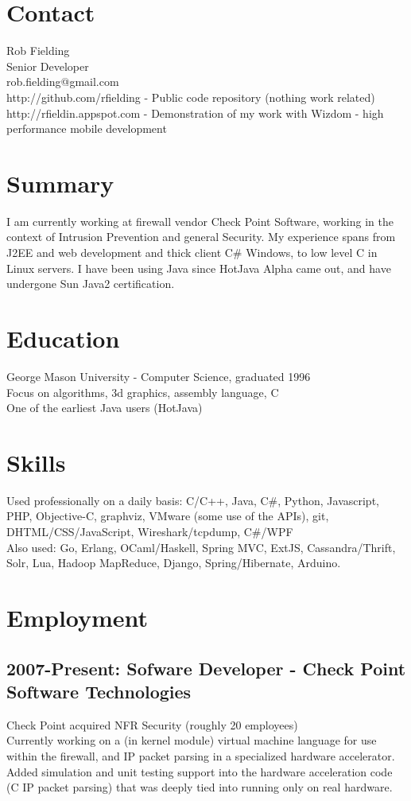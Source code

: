 \documentclass[margin]{res}
\begin{document}
\begin{resume}
\section{Contact}
Rob Fielding \\
Senior Developer \\
rob.fielding@gmail.com \\
http://github.com/rfielding - Public code repository (nothing work related) \\
http://rfieldin.appspot.com - Demonstration of my work with Wizdom - high performance mobile development 

\section{Summary}
I am currently working at firewall vendor Check Point Software,
working in the context of Intrusion Prevention and general Security.
My experience spans from J2EE and web development and thick client
C\# Windows, to low level C in Linux servers.
I have been using Java since HotJava Alpha came out, and have undergone
Sun Java2 certification.

\section{Education}
George Mason University - Computer Science, graduated 1996 \\
Focus on algorithms, 3d graphics, assembly language, C \\
One of the earliest Java users (HotJava) 

\section{Skills}
Used professionally on a daily basis: C/C++, Java, C\#, Python, Javascript, PHP, Objective-C, graphviz, VMware (some use of the APIs), git, DHTML/CSS/JavaScript, Wireshark/tcpdump, C\#/WPF \\

Also used: Go, Erlang, OCaml/Haskell, Spring MVC, ExtJS, Cassandra/Thrift, Solr, Lua, Hadoop MapReduce, Django, Spring/Hibernate, Arduino. 

\section{Employment}
\subsection{2007-Present: Sofware Developer - Check Point Software Technologies}
Check Point acquired NFR Security (roughly 20 employees) \\
Currently working on a (in kernel module) virtual machine language for use within the firewall, and IP packet parsing in a specialized hardware accelerator.
Added simulation and unit testing support into the hardware acceleration code (C IP packet parsing) that was deeply tied into running only on real hardware.  \\


\end{resume}
\end{document}
